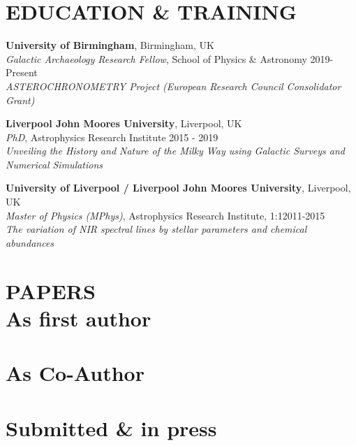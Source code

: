 \documentclass[margin]{res}
\begin{document}
\begin{resume}
\section{EDUCATION \& TRAINING}
\textbf{University of Birmingham}, Birmingham, UK\\
{\sl Galactic Archaeology Research Fellow}, School of Physics \& Astronomy \hfill 2019-Present\\
\emph{ASTEROCHRONOMETRY Project (European Research Council Consolidator Grant)}

\textbf{Liverpool John Moores University}, Liverpool, UK\\
{\sl PhD}, Astrophysics Research Institute \hfill 2015 - 2019\\
\emph{Unveiling the History and Nature of the Milky Way using Galactic Surveys and Numerical Simulations}

\textbf{University of Liverpool / Liverpool John Moores University}, Liverpool, UK\\
{\sl Master of Physics (MPhys)}, Astrophysics Research Institute, 1:1\hfill 2011-2015
\\
\emph{The variation of NIR spectral lines by stellar parameters and chemical abundances}


\section{PAPERS\\ As first author}
\begin{itemize}

\end{itemize}
\section{As Co-Author}
\begin{itemize}

\end{itemize}
\section{Submitted \& in press}
\begin{itemize}

\end{itemize}

\end{resume}
\end{document}
